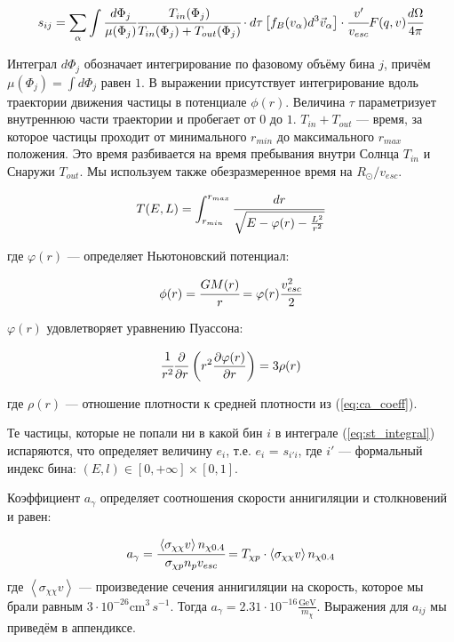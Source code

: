 \documentclass[a4paper, 14pt]{article}
\newcommand{\deriv}[2]{\frac{\partial #1}{\partial #2}}
\newcommand{\avarage}[1]{\left\langle #1 \right\rangle}
\begin{document}
\begin{equation}
	\label{eq:st_integral}
	s_{ij} = \sum_{\alpha}\int{
		\cfrac{d\Phi_{j}}{\mu(\Phi_{j})}
		\cfrac{T_{in}(\Phi_{j})}{
			T_{in}(\Phi_{j})+T_{out}(\Phi_{j})
		} \cdot d\tau \left[ f_B(v_{\alpha}) d^3 \vec{v}_{\alpha} \right] \cdot \cfrac{v'}{v_{esc}} F(q,v) \cfrac{d\Omega}{4\pi}
	}
\end{equation}

\noindent Интеграл $d\Phi_{j}$ обозначает интегрирование по фазовому объёму бина $j$, причём $\mu(\Phi_{j}) = \int{d\Phi_{j}}$ равен $1$. В выражении присутствует интегрирование вдоль траектории движения частицы в потенциале $\phi(r)$. Величина $\tau$ параметризует внутреннюю части траектории и пробегает от $0$ до $1$. $T_{in} + T_{out}$ --- время, за которое частицы проходит от минимального $r_{min}$ до максимального $r_{max}$ положения. Это время разбивается на время пребывания внутри Солнца $T_{in}$ и Снаружи $T_{out}$. Мы используем также обезразмеренное время на $R_{\odot}/v_{esc}$.

\begin{equation*}
	T(E,L) = \int_{r_{min}}^{r_{max}}{\cfrac{dr}{
			\sqrt{E - \varphi(r) - \frac{L^2}{r^2}}
		} 
	}
\end{equation*}

где $\varphi(r)$ --- определяет Ньютоновский потенциал:

\begin{equation*}
	\phi(r) = \cfrac{GM(r)}{r} = \varphi(r) \cfrac{v_{esc}^2}{2} 
\end{equation*}

$\varphi(r)$ удовлетворяет уравнению Пуассона:

\begin{equation}
	\cfrac{1}{r^2}\deriv{}{r}
	\left(r^2\deriv{\varphi(r)}{r}\right) = 3\rho(r)
\end{equation}

где $\rho(r)$ --- отношение плотности к средней плотности из (\ref{eq:ca_coeff}).


Те частицы, которые не попали ни в какой бин $i$ в интеграле (\ref{eq:st_integral}) испаряются, что определяет величину $e_i$, т.е. $e_i$ = $s_{i'i}$, где $i'$ --- формальный индекс бина: $(E,l) \in [0,+\infty]\times[0,1]$.

Коэффициент $a_{\gamma}$ определяет соотношения скорости аннигиляции и столкновений и равен:

\begin{equation}
	a_{\gamma} = \cfrac{ \avarage{\sigma_{\chi\chi} v} n_{\chi 0.4}}{\sigma_{\chi p} n_{p} v_{esc}} = 
	T_{\chi p} \cdot \avarage{\sigma_{\chi\chi} v} n_{\chi 0.4}
\end{equation}
где $\avarage{\sigma_{\chi\chi} v}$ --- произведение сечения аннигиляции на скорость, которое мы брали равным $3\cdot10^{-26}\text{cm}^3\,{s^{-1}}$. Тогда $a_{\gamma} = 2.31\cdot10^{-16} \frac{\text{GeV}}{m_{\chi}}$. Выражения для $a_{ij}$ мы приведём в аппендиксе.
\end{document}
